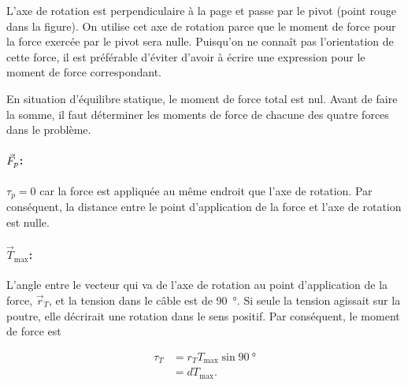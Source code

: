 \documentclass{tufte-handout}
\begin{document}
L'axe de rotation est perpendiculaire à la page et passe par le pivot (point
rouge dans la figure).  On utilise cet axe de rotation parce que le moment de
force pour la force exercée par le pivot sera nulle.  Puisqu'on ne connaît pas
l'orientation de cette force, il est préférable d'éviter d'avoir à écrire une
expression pour le moment de force correspondant.

En situation d'équilibre statique, le moment de force total est nul. Avant de
faire la somme, il faut déterminer les moments de force de chacune des quatre
forces dans le problème.

\paragraph{$\vec{F}_p$:}
$\tau_p = 0$ car la force est appliquée au même endroit que l'axe de rotation.
Par conséquent, la distance entre le point d'application de la force et l'axe
de rotation est nulle.


\paragraph{$\vec{T}_\mathrm{max}$:}
L'angle entre le vecteur qui va de l'axe de rotation au point d'application de
la force, $\vec{r}_T$, et la tension dans le câble est de \SI{90}{\degree}.  Si
seule la tension agissait sur la poutre, elle décrirait une rotation dans le
sens positif.  Par conséquent, le moment de force est
\begin{marginfigure}
  \begin{center}
  \end{center}
\end{marginfigure}
\begin{align*}
  \tau_T &= r_T T_\mathrm{max} \sin \SI{90}{\degree} \\
         &= dT_\mathrm{max}.
\end{align*}
\end{document}
